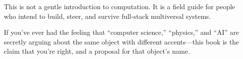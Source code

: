 This is not a gentle introduction to computation.
It is a field guide for people who intend to build, steer, and survive
full-stack multiversal systems.

If you’ve ever had the feeling that “computer science,” “physics,” and “AI”
are secretly arguing about the same object with different accents—this book
is the claim that you’re right, and a proposal for that object’s name.
